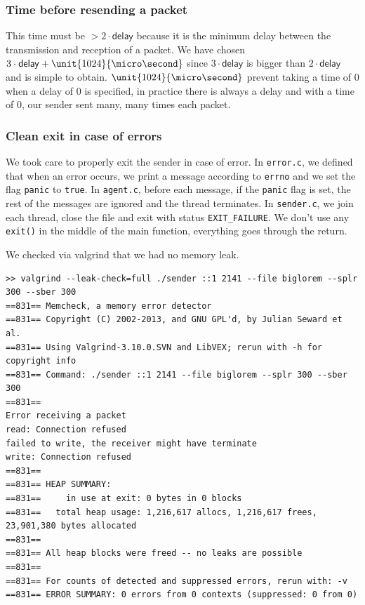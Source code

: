 \documentclass[11pt,a4paper]{article}
\begin{document}
\subsubsection{Time before resending a packet}
This time must be $> 2 \cdot \mathsf{delay}$ because it is the minimum delay between the transmission and reception of a packet.
We have chosen $3 \cdot \mathsf{delay} + \unit{1024}{\micro\second}$ since $3 \cdot \mathsf{delay}$ is bigger than $2 \cdot \mathsf{delay}$ and is simple to obtain.
$\unit{1024}{\micro\second}$ prevent taking a time of 0 when a delay of $0$ is specified,
in practice there is always a delay and with a time of 0, our sender sent many, many times each packet.

\subsubsection{Clean exit in case of errors}
We took care to properly exit the sender in case of error. In \lstinline|error.c|, we defined that when an error occurs, we print a message according to \lstinline|errno|
and we set the flag \lstinline|panic| to \lstinline|true|. In \lstinline|agent.c|, before each message, if the \lstinline|panic| flag is set, the rest of the messages are ignored and the thread terminates. In \lstinline|sender.c|, we join each thread, close the file and exit with status \lstinline|EXIT_FAILURE|. We don't use any \texttt{exit()} in the middle of the main function, everything goes through the return.

We checked via valgrind that we had no memory leak.
\begin{lstlisting}[basicstyle=\ttfamily, basicstyle=\scriptsize]
>> valgrind --leak-check=full ./sender ::1 2141 --file biglorem --splr 300 --sber 300
==831== Memcheck, a memory error detector
==831== Copyright (C) 2002-2013, and GNU GPL'd, by Julian Seward et al.
==831== Using Valgrind-3.10.0.SVN and LibVEX; rerun with -h for copyright info
==831== Command: ./sender ::1 2141 --file biglorem --splr 300 --sber 300
==831==
Error receiving a packet
read: Connection refused
failed to write, the receiver might have terminate
write: Connection refused
==831==
==831== HEAP SUMMARY:
==831==     in use at exit: 0 bytes in 0 blocks
==831==   total heap usage: 1,216,617 allocs, 1,216,617 frees, 23,901,380 bytes allocated
==831==
==831== All heap blocks were freed -- no leaks are possible
==831==
==831== For counts of detected and suppressed errors, rerun with: -v
==831== ERROR SUMMARY: 0 errors from 0 contexts (suppressed: 0 from 0)
\end{lstlisting}
\end{document}
